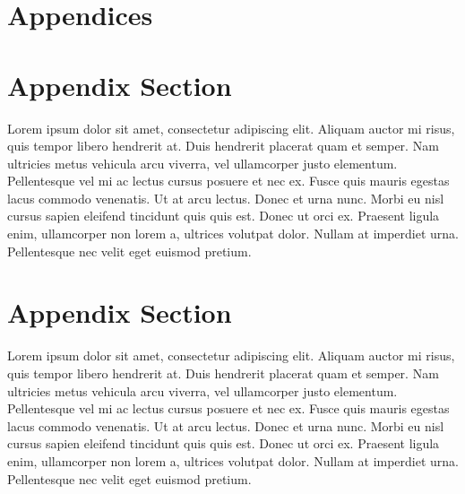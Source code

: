 \documentclass[
	a4paper, %
	11pt, %
]{DC_Report}
\begin{document}
\begin{twothirdswidth} %
	\printbibliography[title=Reference List] %
\end{twothirdswidth}





\section*{Appendices}

\begin{appendices}

\section{Appendix Section}

Lorem ipsum dolor sit amet, consectetur adipiscing elit. Aliquam auctor mi risus, quis tempor libero hendrerit at. Duis hendrerit placerat quam et semper. Nam ultricies metus vehicula arcu viverra, vel ullamcorper justo elementum. Pellentesque vel mi ac lectus cursus posuere et nec ex. Fusce quis mauris egestas lacus commodo venenatis. Ut at arcu lectus. Donec et urna nunc. Morbi eu nisl cursus sapien eleifend tincidunt quis quis est. Donec ut orci ex. Praesent ligula enim, ullamcorper non lorem a, ultrices volutpat dolor. Nullam at imperdiet urna. Pellentesque nec velit eget euismod pretium.

\section{Appendix Section}

Lorem ipsum dolor sit amet, consectetur adipiscing elit. Aliquam auctor mi risus, quis tempor libero hendrerit at. Duis hendrerit placerat quam et semper. Nam ultricies metus vehicula arcu viverra, vel ullamcorper justo elementum. Pellentesque vel mi ac lectus cursus posuere et nec ex. Fusce quis mauris egestas lacus commodo venenatis. Ut at arcu lectus. Donec et urna nunc. Morbi eu nisl cursus sapien eleifend tincidunt quis quis est. Donec ut orci ex. Praesent ligula enim, ullamcorper non lorem a, ultrices volutpat dolor. Nullam at imperdiet urna. Pellentesque nec velit eget euismod pretium.


\end{appendices}
\end{document}

